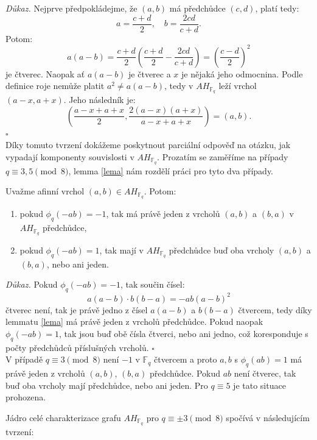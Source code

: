 \documentclass[12pt]{report}
\begin{document}
\noindent \textit{Důkaz.} Nejprve předpokládejme, že $(a,b)$ má předchůdce $(c,d)$, platí tedy:
\begin{equation*}
a = \frac{c+d}{2}, \quad b = \frac{2cd}{c+d}.
\end{equation*}
Potom:
\begin{equation*}
a(a-b) = \frac{c+d}{2} \left( \frac{c+d}{2} - \frac{2cd}{c+d} \right) =\left( \frac{c-d}{2}\right)^2
\end{equation*}
je čtverec. Naopak ať $a(a-b)$ je čtverec a $x$ je nějaká jeho odmocnina. Podle definice roje nemůže platit $a^2 \neq a(a-b)$, tedy v $AH_{\mathbb{F}_q}$ leží vrchol $(a-x,a+x)$.  Jeho následník je: $$\left(\frac{a-x+a+x}{2}, \frac{2 (a-x)(a+x)}{a-x+a+x} \right)= \left(a, b \right).$$ \hfill $\square$\\


Díky tomuto tvrzení dokážeme poskytnout parciální odpověď na otázku, jak vypadají komponenty souvislosti v $AH_{\mathbb{F}_q}$. Prozatím se zaměříme na případy $q \equiv 3,5 \pmod{8}$, lemma \ref{lema} nám rozdělí práci pro tyto dva případy.

\begin{dusledek}\label{dusl}
Uvažme afinní vrchol $(a,b) \in AH_{\mathbb{F}_q}$. Potom:
\begin{enumerate}
\item pokud $\phi_q(-ab) = -1$, tak má právě jeden z vrcholů $(a,b)$ a $(b,a)$ v $AH_{\mathbb{F}_q}$ předchůdce,
\item pokud $\phi_q(-ab) = 1$, tak mají v $AH_{\mathbb{F}_q}$ předchůdce buď oba vrcholy $(a,b)$ a $(b,a)$, nebo ani jeden.
\end{enumerate}
\end{dusledek}
\noindent \textit{Důkaz.} Pokud $\phi_q(-ab) = -1$, tak součin čísel: $$a(a-b) \cdot b (b-a) = -ab(a-b)^2$$
čtverec není, tak je právě jedno z čísel $a(a-b)$ a $b(b-a)$ čtvercem, tedy díky lemmatu \ref{lema} má právě jeden z vrcholů předchůdce. Pokud naopak $\phi_q(-ab) =1$, tak jsou buď obě čísla čtverci, nebo ani jedno, což koresponduje s počty předchůdců příslušných vrcholů. \hfill $\square$\\

V případě $q \equiv 3 \pmod{8}$ není $-1$ v $\mathbb{F}_q$ čtvercem a proto $a,b$ s $\phi_q (ab) = 1$ má právě jeden z vrcholů $(a,b)$, $(b,a)$ předchůdce. Pokud $ab$ není čtverec, tak buď oba vrcholy mají předchůdce, nebo ani jeden. Pro $q \equiv 5$ je tato situace prohozena. 

Jádro celé charakterizace grafu $AH_{\mathbb{F}_q}$ pro $q \equiv \pm 3 \pmod{8}$ spočívá v následujícím tvrzení:
\end{document}
